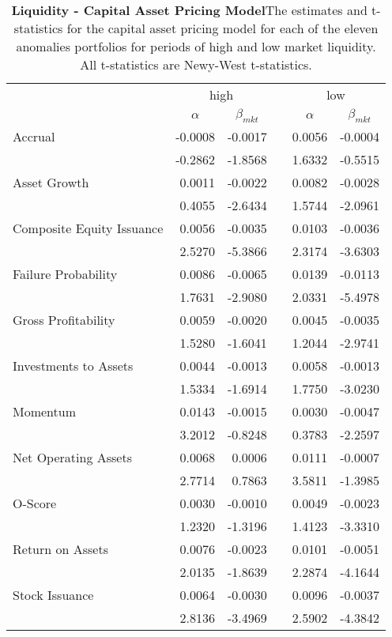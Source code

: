 \begin{table}[htbp]
\centering
\scriptsize
\caption[LIQ - Capital Asset Pricing Model]{\textbf{Liquidity - Capital Asset Pricing Model}\newline The estimates and t-statistics for the capital asset pricing model for each of the eleven anomalies portfolios for periods of high and low market liquidity.  All t-statistics are Newy-West t-statistics.}
\begin{tabular}{lrrrrr}
\toprule
& \multicolumn{2}{c}{high} &       & \multicolumn{2}{c}{low} \\
\cmidrule{2-3}\cmidrule{5-6}          & \multicolumn{1}{c}{$\alpha$} & \multicolumn{1}{c}{$\beta_{mkt}$} &       & \multicolumn{1}{c}{$\alpha$} & \multicolumn{1}{c}{$\beta_{mkt}$} \\
\midrule
Accrual & -0.0008 & -0.0017 &       & 0.0056 & -0.0004 \\
& -0.2862 & -1.8568 &       & 1.6332 & -0.5515 \\
Asset Growth & 0.0011 & -0.0022 &       & 0.0082 & -0.0028 \\
& 0.4055 & -2.6434 &       & 1.5744 & -2.0961 \\
Composite Equity Issuance & 0.0056 & -0.0035 &       & 0.0103 & -0.0036 \\
& 2.5270 & -5.3866 &       & 2.3174 & -3.6303 \\
Failure Probability & 0.0086 & -0.0065 &       & 0.0139 & -0.0113 \\
& 1.7631 & -2.9080 &       & 2.0331 & -5.4978 \\
Gross Profitability & 0.0059 & -0.0020 &       & 0.0045 & -0.0035 \\
& 1.5280 & -1.6041 &       & 1.2044 & -2.9741 \\
Investments to Assets & 0.0044 & -0.0013 &       & 0.0058 & -0.0013 \\
& 1.5334 & -1.6914 &       & 1.7750 & -3.0230 \\
Momentum & 0.0143 & -0.0015 &       & 0.0030 & -0.0047 \\
& 3.2012 & -0.8248 &       & 0.3783 & -2.2597 \\
Net Operating Assets & 0.0068 & 0.0006 &       & 0.0111 & -0.0007 \\
& 2.7714 & 0.7863 &       & 3.5811 & -1.3985 \\
O-Score & 0.0030 & -0.0010 &       & 0.0049 & -0.0023 \\
& 1.2320 & -1.3196 &       & 1.4123 & -3.3310 \\
Return on Assets & 0.0076 & -0.0023 &       & 0.0101 & -0.0051 \\
& 2.0135 & -1.8639 &       & 2.2874 & -4.1644 \\
Stock Issuance & 0.0064 & -0.0030 &       & 0.0096 & -0.0037 \\
& 2.8136 & -3.4969 &       & 2.5902 & -4.3842 \\
\bottomrule
\end{tabular}%
\label{tab:liq-capm}%
\end{table}%

